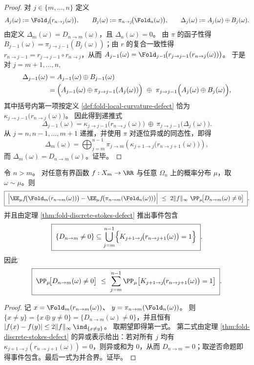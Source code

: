 \begin{proof}
对 \(j\in\{m,\dots,n\}\) 定义
\[
A_j(\omega):=\Fold_j\!\bigl(r_{n\to j}(\omega)\bigr),\qquad
B_j(\omega):=\pi_{n\to j}\!\bigl(\Fold_n(\omega)\bigr),\qquad
\Delta_j(\omega):=A_j(\omega)\oplus B_j(\omega).
\]
由定义 \(\Delta_m(\omega)=D_{n\to m}(\omega)\)，且 \(\Delta_n(\omega)=0\)。
由 \(\pi\) 的函子性得 \(B_{j-1}(\omega)=\pi_{j\to j-1}(B_j(\omega))\)；由 \(r\) 的复合一致性得 \(r_{n\to j-1}=r_{j\to j-1}\circ r_{n\to j}\)，从而
\(
A_{j-1}(\omega)=\Fold_{j-1}\!\bigl(r_{j\to j-1}(r_{n\to j}(\omega))\bigr)
\)。
于是对 \(j=m+1,\dots,n\),
\[
\begin{aligned}
\Delta_{j-1}(\omega)
&=A_{j-1}(\omega)\oplus B_{j-1}(\omega)\\
&=\Bigl(A_{j-1}(\omega)\oplus \pi_{j\to j-1}(A_j(\omega))\Bigr)\ \oplus\ \pi_{j\to j-1}\Bigl(A_j(\omega)\oplus B_j(\omega)\Bigr),
\end{aligned}
\]
其中括号内第一项按定义 \ref{def:fold-local-curvature-defect} 恰为
\(
\kappa_{j\to j-1}\!\bigl(r_{n\to j}(\omega)\bigr)
\)。
因此得到递推式
\[
\Delta_{j-1}(\omega)
=\kappa_{j\to j-1}\!\bigl(r_{n\to j}(\omega)\bigr)\ \oplus\ \pi_{j\to j-1}\!\bigl(\Delta_j(\omega)\bigr).
\]
从 \(j=n,n-1,\dots,m+1\) 递推，并使用 \(\pi\) 对逐位异或的同态性，即得
\[
\Delta_m(\omega)=\bigoplus_{j=m}^{n-1}\pi_{j\to m}\!\left(\kappa_{j+1\to j}\!\bigl(r_{n\to j+1}(\omega)\bigr)\right),
\]
而 \(\Delta_m(\omega)=D_{n\to m}(\omega)\)。证毕。
\end{proof}


\begin{corollary}[多尺度曲率积分的误差上界]\label{cor:fold-discrete-stokes-auditable-bound}
令 \(n>m\)。
对任意有界函数 \(f:X_m\to\RR\) 与任意 \(\Omega_n\) 上的概率分布 \(\mu\)，取 \(\omega\sim\mu\)。则
\[
\boxed{\;
\Bigl|\EE_\mu f\!\bigl(\Fold_m(r_{n\to m}(\omega))\bigr)-\EE_\mu f\!\bigl(\pi_{n\to m}(\Fold_n(\omega))\bigr)\Bigr|
\ \le\ 2\|f\|_\infty\ \PP_\mu\!\bigl[D_{n\to m}(\omega)\neq 0\bigr]\; }.
\]
并且由定理 \ref{thm:fold-discrete-stokes-defect} 推出事件包含
\[
\boxed{\;
\{D_{n\to m}\neq 0\}\subseteq \bigcup_{j=m}^{n-1}\Bigl\{K_{j+1\to j}\!\bigl(r_{n\to j+1}(\omega)\bigr)=1\Bigr\}\; }.
\]
因此
\[
\boxed{\;
\PP_\mu\!\bigl[D_{n\to m}(\omega)\neq 0\bigr]\ \le\ \sum_{j=m}^{n-1}\PP_\mu\!\left[K_{j+1\to j}\!\bigl(r_{n\to j+1}(\omega)\bigr)=1\right]\; }.
\]
\end{corollary}

\begin{proof}
记
\(
x=\Fold_m(r_{n\to m}(\omega))
\)、
\(
y=\pi_{n\to m}(\Fold_n(\omega))
\)。
则 \(\{x\neq y\}=\{x\oplus y\neq 0\}=\{D_{n\to m}(\omega)\neq 0\}\)，并且恒有
\(
|f(x)-f(y)|\le 2\|f\|_\infty\,\ind_{\{x\neq y\}}
\)。
取期望即得第一式。
第二式由定理 \ref{thm:fold-discrete-stokes-defect} 的异或表示给出：若对所有 \(j\) 均有 \(\kappa_{j+1\to j}(r_{n\to j+1}(\omega))=0\)，则异或和为 \(0\)，从而 \(D_{n\to m}=0\)；取逆否命题即得事件包含。最后一式为并合界。证毕。
\end{proof}


